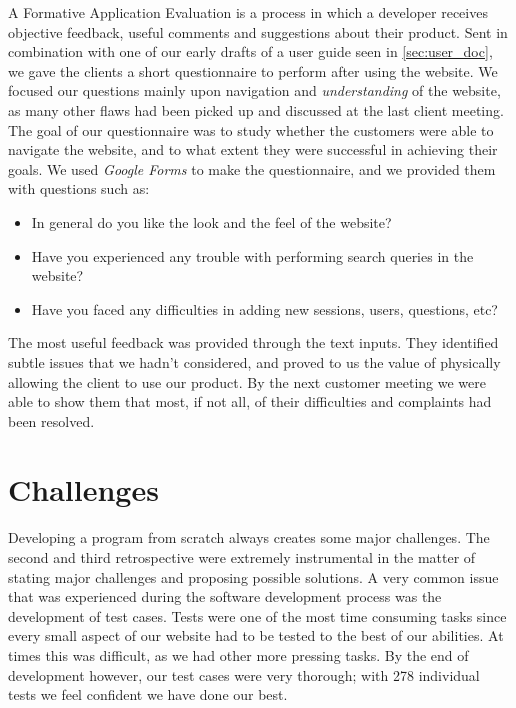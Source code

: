 \documentclass{l3proj}
\begin{document}
A Formative Application Evaluation is a process in which a developer receives objective feedback, useful comments and suggestions about their product. Sent in combination with one of our early drafts of a user guide seen in \autoref{sec:user_doc}, we gave the clients a short questionnaire to perform after using the website. We focused our questions mainly upon navigation and \textit{understanding} of the website, as many other flaws had been picked up and discussed at the last client meeting. The goal of our questionnaire was to study whether the customers were able to navigate the website, and to what extent they were successful in achieving their goals. We used \textit{Google Forms} to make the questionnaire, and we provided them with questions such as:
\begin{itemize}
 \item In general do you like the look and the feel of the website?
 \item Have you experienced any trouble with performing search queries in the website?
 \item Have you faced any difficulties in adding new sessions, users, questions, etc?
\end{itemize}

The most useful feedback was provided through the text inputs. They identified subtle issues that we hadn't considered, and proved to us the value of physically allowing the client to use our product. By the next customer meeting we were able to show them that most, if not all, of their difficulties and complaints had been resolved.


\section{Challenges}
\label{challenges}

Developing a program from scratch always creates some major challenges. The second and third retrospective were extremely instrumental in the matter of stating major challenges and proposing possible solutions. A very common issue that was experienced during the software development process was the development of test cases. Tests were one of the most time consuming tasks since every small aspect of our website had to be tested to the best of our abilities. At times this was difficult, as we had other more pressing tasks. By the end of development however, our test cases were very thorough; with 278 individual tests we feel confident we have done our best.
\end{document}
